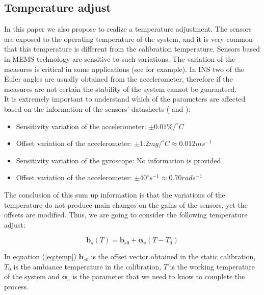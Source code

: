 \documentclass[conference]{IEEEtran}
\newcommand{\refp}[1]{(\ref{#1})}
\begin{document}
\subsection{Temperature adjust}
\label{sec:param_temp}

In this paper we also propose to realize a temperature adjustment. The sensors are exposed to the operating temperature of the system, and it is very common that this temperature is different from the calibration temperature. Sensors based in MEMS technology are sensitive to such variations. The variation of the measures is critical in some applications (see \cite{bib:uquad} for example). In INS two of the Euler angles are usually obtained from the accelerometer, therefore if the measures are not certain the stability of the system cannot be guaranteed.\\

It is extremely important to understand which of the parameters are affected based on the information of the sensors' datasheets (\cite{bib:acc_data} and \cite{bib:gyro_data}):

\begin{itemize}
\item Sensitivity variation of the accelerometer: $\pm 0.01 \%/^\circ C$
\item Offset variation of the accelerometer: $\pm 1.2mg/^\circ C \approx 0.012m s^{-1}$
\item Sensitivity variation of the gyroscope: No information is provided. 
\item Offset variation of the accelerometer: $\pm 40 ^\circ s^{-1} \approx 0.70 rad s^{-1}$
\end{itemize}

The conclusion of this sum up information is that the variations of the temperature do not produce main changes on the gains of the sensors, yet the offsets are modified. Thus, we are going to consider the following temperature adjust:

\begin{equation}
\mathbf{b}_s(T) = \mathbf{b}_{s0} + \boldsymbol{\alpha}_s (T-T_0)
\label{eq:temp}
\end{equation}

In equation \refp{eq:temp} $\mathbf{b}_{s0}$ is the offset vector obtained in the static calibration, $T_0$ is the ambiance temperature in the calibration, $T$ is the working temperature of the system and $\boldsymbol{\alpha}_s$ is the parameter that we need to know to complete the process.\\ 
\end{document}
